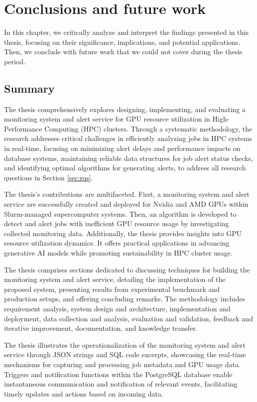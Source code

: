\chapter{Conclusions and future work}
\label{chap:conclusions}
In this chapter, we critically analyze and interpret the findings presented in this thesis, focusing on their significance, implications, and potential applications. Then, we conclude with future work that we could not cover during the thesis period.

\section{Summary}

The thesis comprehensively explores designing, implementing, and evaluating a monitoring system and alert service for GPU resource utilization in High-Performance Computing (HPC) clusters. Through a systematic methodology, the research addresses critical challenges in efficiently analyzing jobs in HPC systems in real-time, focusing on minimizing alert delays and performance impacts on database systems, maintaining reliable data structures for job alert status checks, and identifying optimal algorithms for generating alerts, to address all research questions in Section \ref{sec:rqs}.

The thesis's contributions are multifaceted. First, a monitoring system and alert service are successfully created and deployed for Nvidia and AMD GPUs within Slurm-managed supercomputer systems. Then, an algorithm is developed to detect and alert jobs with inefficient GPU resource usage by investigating collected monitoring data. Additionally, the thesis provides insights into GPU resource utilization dynamics. It offers practical applications in advancing generative AI models while promoting sustainability in HPC cluster usage.

The thesis comprises sections dedicated to discussing techniques for building the monitoring system and alert service, detailing the implementation of the proposed system, presenting results from experimental benchmark and production setups, and offering concluding remarks. The methodology includes requirement analysis, system design and architecture, implementation and deployment, data collection and analysis, evaluation and validation, feedback and iterative improvement, documentation, and knowledge transfer.

The thesis illustrates the operationalization of the monitoring system and alert service through JSON strings and SQL code excerpts, showcasing the real-time mechanisms for capturing and processing job metadata and GPU usage data. Triggers and notification functions within the PostgreSQL database enable instantaneous communication and notification of relevant events, facilitating timely updates and actions based on incoming data.

